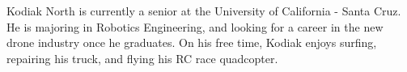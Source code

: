 \documentclass[12pt,journal,compsoc]{IEEEtran}
\begin{document}

 


\begin{IEEEbiographynophoto}{Kodiak North}
is currently a senior at the University of California - Santa Cruz. He is majoring in Robotics Engineering, and looking for a career in the new drone industry once he graduates. On his free time, Kodiak enjoys surfing, repairing his truck, and flying his RC race quadcopter.
\end{IEEEbiographynophoto}





\end{document}
